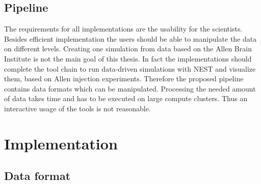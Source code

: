 \documentclass[a4paper]{article}
\begin{document}
\subsection{Pipeline}
The requirements for all implementations are the usability for the scientists. Besides efficient implementation the users should be able to manipulate the data on different levels. Creating one simulation from data based on the Allen Brain Institute is not the main goal of this thesis. In fact the implementations should complete the tool chain to run data-driven simulations with NEST and visualize them, based on Allen injection experiments. Therefore the proposed pipeline contains data formats which can be manipulated. Processing the needed amount of data takes time and has to be executed on large compute clusters. Thus an interactive usage of the tools is not reasonable.

\newpage
\section{Implementation}

\subsection{Data format}
\end{document}
